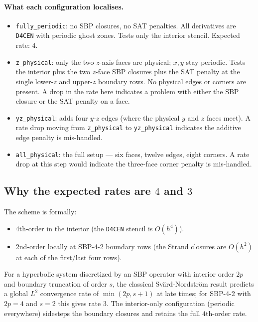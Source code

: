 \documentclass[11pt]{article}
\begin{document}
\paragraph{What each configuration localises.}
\begin{itemize}
  \item \texttt{fully\_periodic}: no SBP closures, no SAT penalties.
    All derivatives are \texttt{D4CEN} with periodic ghost zones.
    Tests only the interior stencil. Expected rate: $4$.
  \item \texttt{z\_physical}: only the two $z$-axis faces are
    physical; $x, y$ stay periodic.  Tests the interior plus the two
    $z$-face SBP closures plus the SAT penalty at the single
    lower-$z$ and upper-$z$ boundary rows.  No physical edges or
    corners are present. A drop in the rate here indicates a problem
    with either the SBP closure or the SAT penalty on a face.
  \item \texttt{yz\_physical}: adds four $y$-$z$ edges (where the
    physical $y$ and $z$ faces meet). A rate drop moving from
    \texttt{z\_physical} to \texttt{yz\_physical} indicates the
    additive edge penalty is mis-handled.
  \item \texttt{all\_physical}: the full setup — six faces, twelve
    edges, eight corners. A rate drop at this step would indicate
    the three-face corner penalty is mis-handled.
\end{itemize}

\subsection{Why the expected rates are $4$ and $3$}

The scheme is formally:
\begin{itemize}
  \item 4th-order in the interior (the \texttt{D4CEN} stencil is
    $O(h^4)$).
  \item 2nd-order locally at SBP-4-2 boundary rows (the Strand
    closures are $O(h^2)$ at each of the first/last four rows).
\end{itemize}
For a hyperbolic system discretized by an SBP operator with interior
order $2p$ and boundary truncation of order $s$, the classical
Svärd-Nordström result predicts a global $L^2$ convergence rate of
$\min(2p, s + 1)$ at late times; for SBP-4-2 with $2p = 4$ and
$s = 2$ this gives rate $3$.  The interior-only configuration
(periodic everywhere) sidesteps the boundary closures and retains
the full $4$th-order rate.
\end{document}
